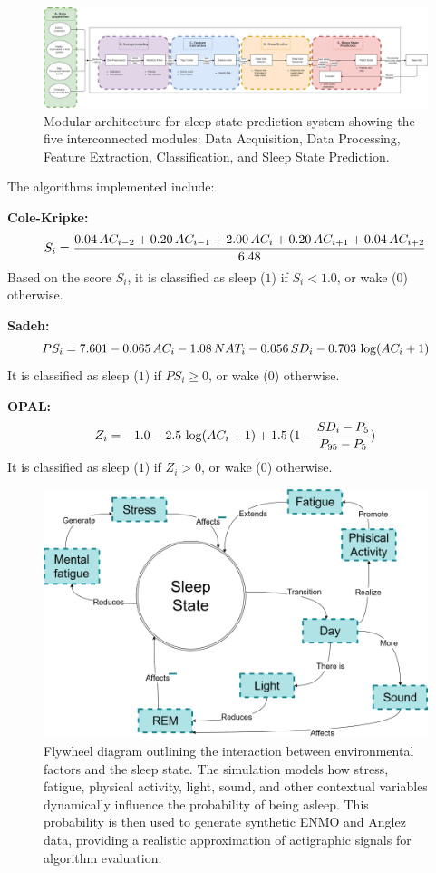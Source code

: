 \documentclass[conference]{IEEEtran}
\begin{document}
\begin{figure}[htbp]
	\centering
	\includegraphics[width=\columnwidth]{system_architecture.png}
	\caption{Modular architecture for sleep state prediction system showing the five interconnected modules: Data Acquisition, Data Processing, Feature Extraction, Classification, and Sleep State Prediction.}
	\label{fig:architecture}
\end{figure}

The algorithms implemented include:

\textbf{Cole-Kripke:}
\begin{equation}
	\scriptsize
	S_i = \frac{0.04\,AC_{i-2} + 0.20\,AC_{i-1} + 2.00\,AC_i + 0.20\,AC_{i+1} + 0.04\,AC_{i+2}}{6.48}
\end{equation}
Based on the score $S_i$, it is classified as sleep ($1$) if $S_i < 1.0$, or wake ($0$) otherwise.


\textbf{Sadeh:}
\begin{equation}
	\scriptsize
	PS_i = 7.601 - 0.065\,AC_i - 1.08\,NAT_i - 0.056\,SD_i - 0.703\,\log(AC_i + 1)
\end{equation}
It is classified as sleep ($1$) if $PS_i \geq 0$, or wake ($0$) otherwise.

\textbf{OPAL:}
\begin{equation}
	\scriptsize
	Z_i = -1.0 - 2.5\,\log(AC_i + 1) + 1.5\,(1 - \frac{SD_i - P_5}{P_{95} - P_5})
\end{equation}
It is classified as sleep ($1$) if $Z_i > 0$, or wake ($0$) otherwise.


\begin{figure}[htbp]
	\centering
	\includegraphics[width=0.85\columnwidth]{simulation.png}
	\caption{Flywheel diagram outlining the interaction between environmental factors and the sleep state. The simulation models how stress, fatigue, physical activity, light, sound, and other contextual variables dynamically influence the probability of being asleep. This probability is then used to generate synthetic ENMO and Anglez data, providing a realistic approximation of actigraphic signals for algorithm evaluation.}
	\label{fig:flywheel_simulation}
\end{figure}
\end{document}
